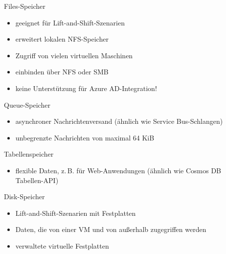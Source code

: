 \begin{flashcard}[Definition]{Files-Speicher}
  \begin{itemize}
    \item geeignet für Lift-and-Shift-Szenarien
    \item erweitert lokalen NFS-Speicher
    \item Zugriff von vielen virtuellen Maschinen
    \item einbinden über NFS oder SMB
    \item keine Unterstützung für Azure AD-Integration!
  \end{itemize}
\end{flashcard}

\begin{flashcard}[Definition]{Queue-Speicher}
  \begin{itemize}
    \item asynchroner Nachrichtenversand\newline
    (ähnlich wie Service Bus-Schlangen)
    \item unbegrenzte Nachrichten von maximal 64 KiB
  \end{itemize}
\end{flashcard}

\begin{flashcard}[Definition]{Tabellenspeicher}
  \begin{itemize}
    \item flexible Daten, z.\,B. für Web-Anwendungen\newline
    (ähnlich wie Cosmos DB Tabellen-API)
  \end{itemize}
\end{flashcard}

\begin{flashcard}[Definition]{Disk-Speicher}
  \begin{itemize}
    \item Lift-and-Shift-Szenarien mit Festplatten
    \item Daten, die von einer VM und von außerhalb zugegriffen werden
    \item verwaltete virtuelle Festplatten
  \end{itemize}
\end{flashcard}



